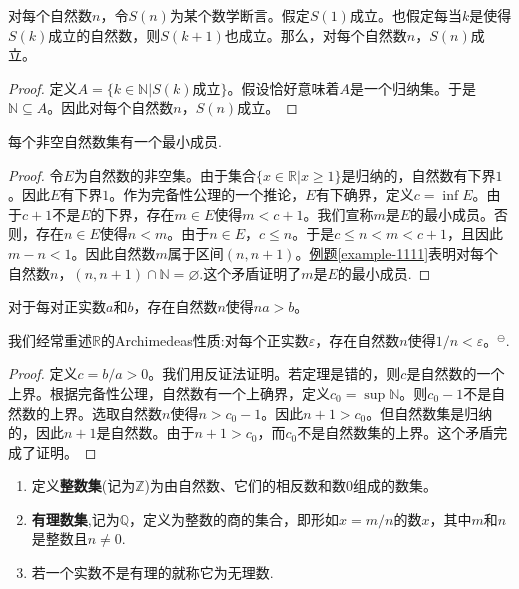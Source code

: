 \documentclass[lang=cn,newtx,10pt,scheme=chinese]{elegantbook}
\begin{document}
\begin{theorem}[数学归纳法原理]\label{theorem:数学归纳法原理}
  对每个自然数\(n\)，令\(S(n)\)为某个数学断言。假定\(S(1)\)成立。也假定每当\(k\)是使得\(S(k)\)成立的自然数，则\(S(k + 1)\)也成立。那么，对每个自然数\(n\)，\(S(n)\)成立。
\end{theorem}
\begin{proof}
  定义\(A = \{k\in\mathbb{N}|S(k)\)成立\(\}\)。假设恰好意味着\(A\)是一个归纳集。于是\(\mathbb{N}\subseteq A\)。因此对每个自然数\(n\)，\(S(n)\)成立。
\end{proof}

\begin{theorem}\label{theorem:每个非空自然数集有一个最小成员.}
  每个非空自然数集有一个最小成员.
\end{theorem}
\begin{proof}
  令\(E\)为自然数的非空集。由于集合\(\{x\in\mathbb{R}|x\geqslant1\}\)是归纳的，自然数有下界\(1\)。因此\(E\)有下界\(1\)。作为完备性公理的一个推论，\(E\)有下确界，定义\(c=\inf E\)。由于\(c + 1\)不是\(E\)的下界，存在\(m\in E\)使得\(m < c + 1\)。我们宣称\(m\)是\(E\)的最小成员。否则，存在\(n\in E\)使得\(n < m\)。由于\(n\in E\)，\(c\leqslant n\)。于是\(c\leqslant n < m < c + 1\)，且因此\(m - n < 1\)。因此自然数\(m\)属于区间\((n, n + 1)\)。\hyperref[example-1111]{例题\ref{example-1111}}表明对每个自然数\(n\)，\((n, n + 1)\cap\mathbb{N}=\varnothing\).这个矛盾证明了\(m\)是\(E\)的最小成员.
\end{proof}

\begin{theorem}[实数的Archimedeas性质]\label{theorem:实数的Archimedeas性质}
  对于每对正实数\(a\)和\(b\)，存在自然数\(n\)使得\(na > b\)。
\end{theorem}
\begin{note}
  我们经常重述\(\mathbb{R}\)的Archimedeas性质:对每个正实数\(\varepsilon\)，存在自然数\(n\)使得\(1/n<\varepsilon\)。$^{\ominus}$.
\end{note}
\begin{proof}
  定义\(c = b/a>0\)。我们用反证法证明。若定理是错的，则\(c\)是自然数的一个上界。根据完备性公理，自然数有一个上确界，定义\(c_0=\sup\mathbb{N}\)。则\(c_0 - 1\)不是自然数的上界。选取自然数\(n\)使得\(n>c_0 - 1\)。因此\(n + 1>c_0\)。但自然数集是归纳的，因此\(n + 1\)是自然数。由于\(n + 1>c_0\)，而\(c_0\)不是自然数集的上界。这个矛盾完成了证明。
\end{proof}

\begin{definition}\label{definition:整数集、有理数集和无理数}
\begin{enumerate}
  \item 定义\textbf{整数集}(记为\(\mathbb{Z}\))为由自然数、它们的相反数和数\(0\)组成的数集。
  \item \textbf{有理数集},记为\(\mathbb{Q}\)，定义为整数的商的集合，即形如\(x = m/n\)的数\(x\)，其中\(m\)和\(n\)是整数且\(n\neq0\).
  \item 若一个实数不是有理的就称它为无理数.
\end{enumerate}
\end{definition}
\end{document}
